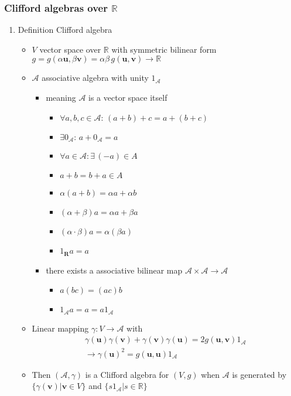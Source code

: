 \documentclass[../main.tex]{subfiles}
\begin{document}
\begin{itemize}
\subsubsection{Clifford algebras over $\mathbb{R}$}
\begin{enumerate}
\item Definition Clifford algebra
\begin{itemize}
\item $V$ vector space over $\mathbb{R}$ with symmetric bilinear form $g=g(\alpha\mathbf{u},\beta\mathbf{v})=\alpha\beta\,g(\mathbf{u},\mathbf{v})\rightarrow\mathbb{R}$ 
\item $\mathcal{A}$ associative algebra with unity $1_\mathcal{A}$
\begin{itemize}
\item meaning $\mathcal{A}$ is a vector space itself
\begin{itemize}
\item $\forall a,b,c\in\mathcal{A}:\, (a+b)+c=a+(b+c)$
\item $\exists 0_\mathcal{A}:\, a+0_\mathcal{A}=a$
\item $\forall a\in \mathcal{A}: \exists\,(-a) \in A$
\item $a+b=b+a \in A$
\item $\alpha(a+b)=\alpha a+\alpha b$
\item $(\alpha+\beta)a=\alpha a+\beta a$
\item $(\alpha\cdot\beta)a=\alpha(\beta a)$
\item $1_\mathbf{R}a=a$
\end{itemize}
\item there exists a associative bilinear map $\mathcal{A}\times\mathcal{A}\rightarrow\mathcal{A}$
\begin{itemize}
\item $a(bc)=(ac)b$
\item $1_\mathcal{A}a=a=a1_\mathcal{A}$
\end{itemize}
\end{itemize}
\item Linear mapping $\gamma:V\rightarrow\mathcal{A}$ with 
\begin{align}
\gamma(\mathbf{u})\gamma(\mathbf{v})+\gamma(\mathbf{v})\gamma(\mathbf{u})=2g(\mathbf{u},\mathbf{v})1_\mathcal{A}\\
\rightarrow \gamma(\mathbf{u})^2=g(\mathbf{u},\mathbf{u})1_\mathcal{A}
\end{align}
\item Then $(\mathcal{A},\gamma)$ is a Clifford algebra for $(V,g)$ when $\mathcal{A}$ is generated by $\{\gamma(\mathbf{v})|\mathbf{v}\in V\}$ and $\{s1_\mathcal{A}|s\in\mathbb{R}\}$

\end{itemize}
\end{enumerate}
\end{itemize}
\end{document}
